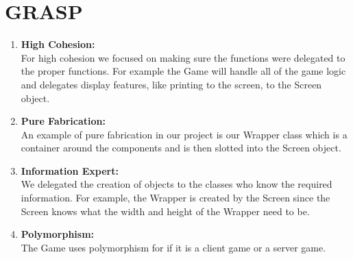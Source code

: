 \documentclass[titlepage]{article}
\begin{document}
	\section{GRASP}
		\begin{enumerate}
			\item \textbf{High Cohesion:}\\
			For high cohesion we focused on making sure the functions were delegated to the proper functions. For example the Game will handle all of the game logic and delegates display features, like printing to the screen, to the Screen object.
			\item \textbf{Pure Fabrication:}\\
			An example of pure fabrication in our project is our Wrapper class which is a container around the components and is then slotted into the Screen object.
			\item \textbf{Information Expert:}\\
			We delegated the creation of objects to the classes who know the required information. For example, the Wrapper is created by the Screen since the Screen knows what the width and height of the Wrapper need to be.
			\item \textbf{Polymorphism:}\\
			The Game uses polymorphism for if it is a client game or a server game.
		\end{enumerate}
	
\end{document}
